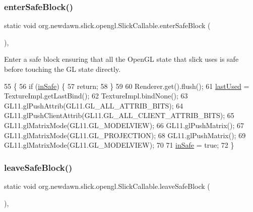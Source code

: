 \subsubsection{\texorpdfstring{enter\+Safe\+Block()}{enterSafeBlock()}}
{\footnotesize\ttfamily static void org.\+newdawn.\+slick.\+opengl.\+Slick\+Callable.\+enter\+Safe\+Block (\begin{DoxyParamCaption}{ }\end{DoxyParamCaption})\hspace{0.3cm}{\ttfamily [inline]}, {\ttfamily [static]}}

Enter a safe block ensuring that all the Open\+GL state that slick uses is safe before touching the GL state directly. 
\begin{DoxyCode}
55     \{
56         \textcolor{keywordflow}{if} (\mbox{\hyperlink{classorg_1_1newdawn_1_1slick_1_1opengl_1_1_slick_callable_a6f60853b128453504f8184a3b6f4e34b}{inSafe}}) \{
57             \textcolor{keywordflow}{return};
58         \}
59         
60         Renderer.get().flush();
61         \mbox{\hyperlink{classorg_1_1newdawn_1_1slick_1_1opengl_1_1_slick_callable_a1b9a4b045be62c494829982f9a8671f2}{lastUsed}} = TextureImpl.getLastBind();
62         TextureImpl.bindNone();
63         GL11.glPushAttrib(GL11.GL\_ALL\_ATTRIB\_BITS);
64         GL11.glPushClientAttrib(GL11.GL\_ALL\_CLIENT\_ATTRIB\_BITS);
65         GL11.glMatrixMode(GL11.GL\_MODELVIEW);
66         GL11.glPushMatrix();
67         GL11.glMatrixMode(GL11.GL\_PROJECTION);
68         GL11.glPushMatrix();
69         GL11.glMatrixMode(GL11.GL\_MODELVIEW);
70         
71         \mbox{\hyperlink{classorg_1_1newdawn_1_1slick_1_1opengl_1_1_slick_callable_a6f60853b128453504f8184a3b6f4e34b}{inSafe}} = \textcolor{keyword}{true};
72     \}
\end{DoxyCode}
\mbox{\label{classorg_1_1newdawn_1_1slick_1_1opengl_1_1_slick_callable_acfce604d621582d39c7466096f46af47}} 
\subsubsection{\texorpdfstring{leave\+Safe\+Block()}{leaveSafeBlock()}}
{\footnotesize\ttfamily static void org.\+newdawn.\+slick.\+opengl.\+Slick\+Callable.\+leave\+Safe\+Block (\begin{DoxyParamCaption}{ }\end{DoxyParamCaption})\hspace{0.3cm}{\ttfamily [inline]}, {\ttfamily [static]}}

